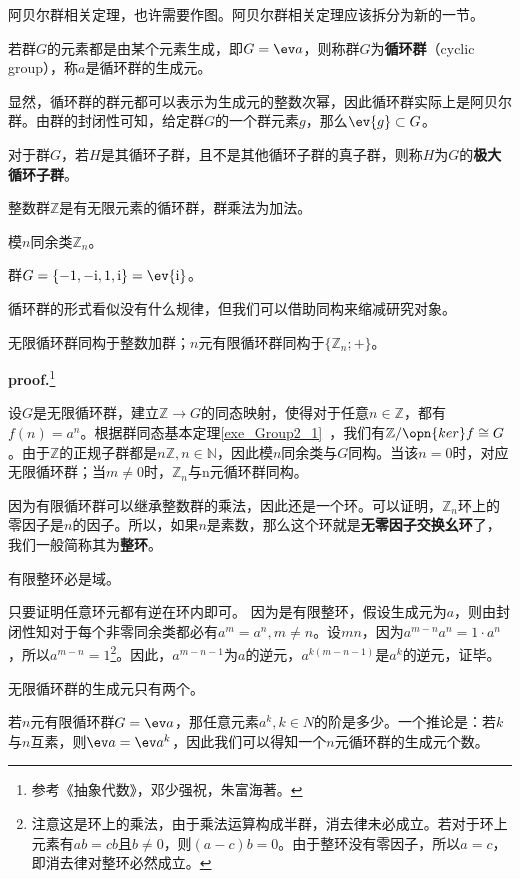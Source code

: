 
\begin{issues}
\issueTODO 阿贝尔群相关定理，也许需要作图。阿贝尔群相关定理应该拆分为新的一节。
\end{issues}

\begin{definition}{}
若群$G$的元素都是由某个元素生成，即$G=\ev  a$，则称群$G$为\textbf{循环群}（cyclic group），称$a$是循环群的生成元。
\end{definition}
显然，循环群的群元都可以表示为生成元的整数次幂，因此循环群实际上是阿贝尔群。由群的封闭性可知，给定群$G$的一个群元素$g$，那么$\ev{g}\subset G$。
\begin{definition}{}
对于群$G$，若$H$是其循环子群，且不是其他循环子群的真子群，则称$H$为$G$的\textbf{极大循环子群}。
\end{definition}

\begin{example}{}
整数群$\mathbb Z$是有无限元素的循环群，群乘法为加法。
\end{example}
\begin{example}{}
模$n$同余类$\mathbb Z_n$。
\end{example}
\begin{example}{}
群$G=\{-1,-\mathrm i,1,\mathrm i\}=\ev {\mathrm i}$。
\end{example}
循环群的形式看似没有什么规律，但我们可以借助同构来缩减研究对象。
\begin{theorem}{}
无限循环群同构于整数加群；$n$元有限循环群同构于$\{\mathbb Z_n;+\}$。
\end{theorem}
\textbf{proof.}\footnote{参考《抽象代数》，邓少强祝，朱富海著。}

设$G$是无限循环群，建立$\mathbb Z\rightarrow G$的同态映射，使得对于任意$n\in \mathbb Z$，都有$f(n)=a^n$。根据群同态基本定理\autoref{exe_Group2_1}~，我们有$\mathbb Z/\opn{ker}f\cong G$。由于$\mathbb Z$的正规子群都是$n\mathbb Z,n\in \mathbb N$，因此模$n$同余类与$G$同构。当该$n=0$时，对应无限循环群；当$m\neq 0$时，$\mathbb Z_n$与n元循环群同构。

因为有限循环群可以继承整数群的乘法，因此还是一个环。可以证明，$\mathbb Z_n$环上的零因子是$n$的因子。所以，如果$n$是素数，那么这个环就是\textbf{无零因子交换幺环}了，我们一般简称其为\textbf{整环}。
\begin{theorem}{}
有限整环必是域。
\end{theorem}
只要证明任意环元都有逆在环内即可。
因为是有限整环，假设生成元为$a$，则由封闭性知对于每个非零同余类都必有$a^m=a^n,m\neq n$。设$m n$，因为$a^{m-n}a^n=1\cdot a^n$，所以$a^{m-n}=1$\footnote{注意这是环上的乘法，由于乘法运算构成半群，消去律未必成立。若对于环上元素有$ab=cb$且$b\neq 0$，则$(a-c)b=0$。由于整环没有零因子，所以$a=c$，即消去律对整环必然成立。}。因此，$a^{m-n-1}$为$a$的逆元，$a^{k(m-n-1)}$是$a^k$的逆元，证毕。
\begin{exercise}{}
无限循环群的生成元只有两个。
\end{exercise}
\begin{exercise}{}
若$n$元有限循环群$G=\ev a$，那任意元素$a^k,k\in N$的阶是多少。一个推论是：若$k$与$n$互素，则$\ev a=\ev a^k$，因此我们可以得知一个$n$元循环群的生成元个数。
\end{exercise}
